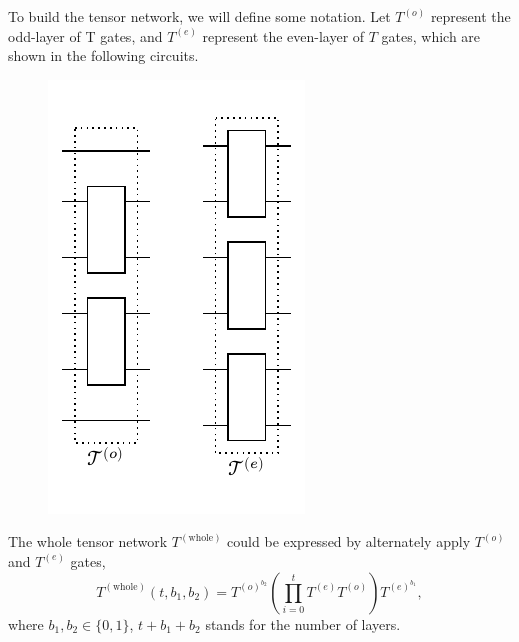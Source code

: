 \documentclass{article}
\newcommand{\Twhole}{T^{(\text{whole})}}
\begin{document}

To build the tensor network, we will define some notation. Let $T^{(o)}$ represent the odd-layer of T gates, and $T^{(e)}$ represent the even-layer of $T$ gates, which are shown in the following circuits.
\begin{figure}[H]
    \centering
    \includegraphics[width=0.22\linewidth]{figures/appendix/Todd_Teven.pdf}
\end{figure}
The whole tensor network $\Twhole$ could be expressed by alternately apply $T^{(o)}$ and $T^{(e)}$ gates, 
\begin{equation}
\Twhole \left(t, b_1, b_2\right)=T^{(o)^{b_2}}\left(\prod_{i=0}^{t} T^{(e)} T^{(o)}\right) T^{(e)^{b_1}}, 
\end{equation}
where $b_1, b_2 \in\{0,1\}$, $t+b_1+b_2$ stands for the number of layers.
\end{document}
